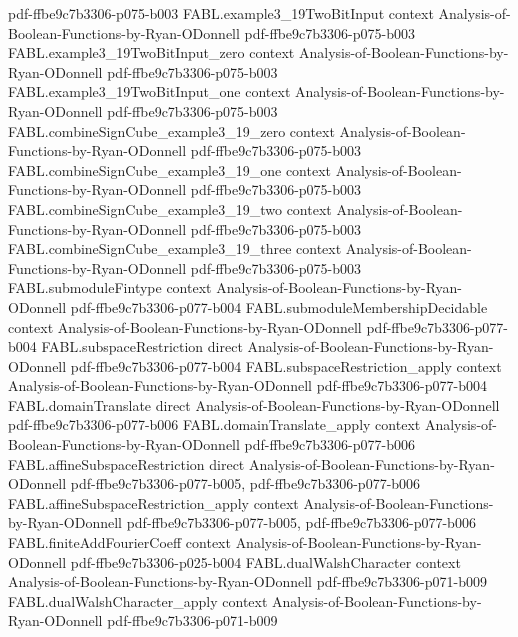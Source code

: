 \begin{theorem}
  {pdf-ffbe9c7b3306-p075-b003}
\proofstep
  {FABL.example3_19TwoBitInput}
  {context}
  {Analysis-of-Boolean-Functions-by-Ryan-ODonnell}
  {pdf-ffbe9c7b3306-p075-b003}
\proofstep
  {FABL.example3_19TwoBitInput_zero}
  {context}
  {Analysis-of-Boolean-Functions-by-Ryan-ODonnell}
  {pdf-ffbe9c7b3306-p075-b003}
\proofstep
  {FABL.example3_19TwoBitInput_one}
  {context}
  {Analysis-of-Boolean-Functions-by-Ryan-ODonnell}
  {pdf-ffbe9c7b3306-p075-b003}
\proofstep
  {FABL.combineSignCube_example3_19_zero}
  {context}
  {Analysis-of-Boolean-Functions-by-Ryan-ODonnell}
  {pdf-ffbe9c7b3306-p075-b003}
\proofstep
  {FABL.combineSignCube_example3_19_one}
  {context}
  {Analysis-of-Boolean-Functions-by-Ryan-ODonnell}
  {pdf-ffbe9c7b3306-p075-b003}
\proofstep
  {FABL.combineSignCube_example3_19_two}
  {context}
  {Analysis-of-Boolean-Functions-by-Ryan-ODonnell}
  {pdf-ffbe9c7b3306-p075-b003}
\proofstep
  {FABL.combineSignCube_example3_19_three}
  {context}
  {Analysis-of-Boolean-Functions-by-Ryan-ODonnell}
  {pdf-ffbe9c7b3306-p075-b003}
\proofstep
  {FABL.submoduleFintype}
  {context}
  {Analysis-of-Boolean-Functions-by-Ryan-ODonnell}
  {pdf-ffbe9c7b3306-p077-b004}
\proofstep
  {FABL.submoduleMembershipDecidable}
  {context}
  {Analysis-of-Boolean-Functions-by-Ryan-ODonnell}
  {pdf-ffbe9c7b3306-p077-b004}
\proofstep
  {FABL.subspaceRestriction}
  {direct}
  {Analysis-of-Boolean-Functions-by-Ryan-ODonnell}
  {pdf-ffbe9c7b3306-p077-b004}
\proofstep
  {FABL.subspaceRestriction_apply}
  {context}
  {Analysis-of-Boolean-Functions-by-Ryan-ODonnell}
  {pdf-ffbe9c7b3306-p077-b004}
\proofstep
  {FABL.domainTranslate}
  {direct}
  {Analysis-of-Boolean-Functions-by-Ryan-ODonnell}
  {pdf-ffbe9c7b3306-p077-b006}
\proofstep
  {FABL.domainTranslate_apply}
  {context}
  {Analysis-of-Boolean-Functions-by-Ryan-ODonnell}
  {pdf-ffbe9c7b3306-p077-b006}
\proofstep
  {FABL.affineSubspaceRestriction}
  {direct}
  {Analysis-of-Boolean-Functions-by-Ryan-ODonnell}
  {pdf-ffbe9c7b3306-p077-b005,
    pdf-ffbe9c7b3306-p077-b006}
\proofstep
  {FABL.affineSubspaceRestriction_apply}
  {context}
  {Analysis-of-Boolean-Functions-by-Ryan-ODonnell}
  {pdf-ffbe9c7b3306-p077-b005,
    pdf-ffbe9c7b3306-p077-b006}
\proofstep
  {FABL.finiteAddFourierCoeff}
  {context}
  {Analysis-of-Boolean-Functions-by-Ryan-ODonnell}
  {pdf-ffbe9c7b3306-p025-b004}
\proofstep
  {FABL.dualWalshCharacter}
  {context}
  {Analysis-of-Boolean-Functions-by-Ryan-ODonnell}
  {pdf-ffbe9c7b3306-p071-b009}
\proofstep
  {FABL.dualWalshCharacter_apply}
  {context}
  {Analysis-of-Boolean-Functions-by-Ryan-ODonnell}
  {pdf-ffbe9c7b3306-p071-b009}

\end{theorem}
